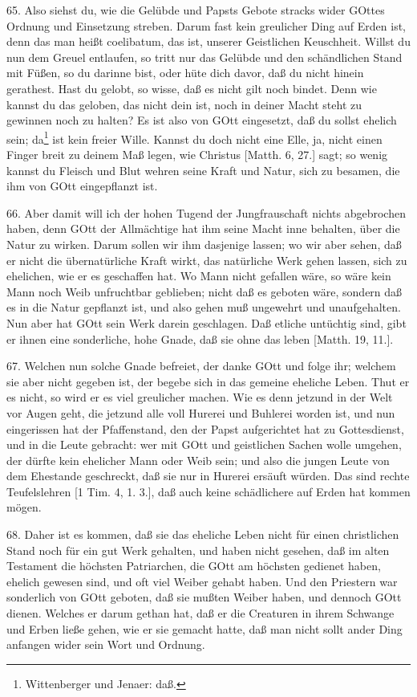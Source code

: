 65. Also siehst du, wie die Gelübde und Papsts Gebote stracks wider GOttes Ordnung und Einsetzung streben. Darum fast kein greulicher Ding auf Erden ist, denn das man heißt coelibatum, das ist, unserer Geistlichen Keuschheit. Willst du nun dem Greuel entlaufen, so tritt nur das Gelübde und den schändlichen Stand mit Füßen, so du darinne bist, oder hüte dich davor, daß du nicht hinein gerathest. Hast du gelobt, so wisse, daß es nicht gilt noch bindet. Denn wie kannst du das geloben, das nicht dein ist, noch in deiner Macht steht zu gewinnen noch zu halten? Es ist also von GOtt eingesetzt, daß du sollst ehelich sein; da\footnote{Wittenberger und Jenaer: daß.} ist kein freier Wille. Kannst du doch nicht eine Elle, ja, nicht einen Finger breit zu deinem Maß legen, wie Christus [Matth. 6, 27.] sagt; so wenig kannst du Fleisch und Blut wehren seine Kraft und Natur, sich zu besamen, die ihm von GOtt eingepflanzt ist.

66. Aber damit will ich der hohen Tugend der Jungfrauschaft nichts abgebrochen haben, denn GOtt der Allmächtige hat ihm seine Macht inne behalten, über die Natur zu wirken. Darum sollen wir ihm dasjenige lassen; wo wir aber sehen, daß er nicht die übernatürliche Kraft wirkt,
das natürliche Werk gehen lassen, sich zu ehelichen, wie er es geschaffen hat. Wo Mann nicht gefallen wäre, so wäre kein Mann noch Weib unfruchtbar geblieben; nicht daß es geboten wäre, sondern daß es in die Natur gepflanzt ist, und also gehen muß ungewehrt und unaufgehalten. Nun aber hat GOtt sein Werk darein geschlagen. Daß etliche untüchtig sind, gibt er ihnen eine sonderliche, hohe Gnade, daß sie ohne das leben [Matth. 19, 11.].

67. Welchen nun solche Gnade befreiet, der danke GOtt und folge ihr; welchem sie aber nicht gegeben ist, der begebe sich in das gemeine eheliche Leben. Thut er es nicht, so wird er es viel greulicher machen. Wie es denn jetzund in der Welt vor Augen geht, die jetzund alle voll Hurerei und Buhlerei worden ist, und nun eingerissen hat der Pfaffenstand, den der Papst aufgerichtet hat zu Gottesdienst, und in die Leute gebracht: wer mit GOtt und geistlichen Sachen wolle umgehen, der dürfte kein ehelicher Mann oder Weib sein; und also die jungen Leute von dem Ehestande geschreckt, daß sie nur in Hurerei ersäuft würden. Das sind rechte Teufelslehren [1 Tim. 4, 1. 3.], daß auch keine schädlichere auf Erden hat kommen mögen.

68. Daher ist es kommen, daß sie das eheliche Leben nicht für einen christlichen Stand noch für ein gut Werk gehalten, und haben nicht gesehen, daß im alten Testament die höchsten Patriarchen, die GOtt am höchsten gedienet haben, ehelich gewesen sind, und oft viel Weiber gehabt haben. Und den Priestern war sonderlich von GOtt geboten, daß sie mußten Weiber haben, und dennoch GOtt dienen. Welches er darum gethan hat, daß er die Creaturen in ihrem Schwange und Erben ließe gehen, wie er sie gemacht hatte, daß man nicht sollt ander Ding anfangen wider sein Wort und Ordnung.

